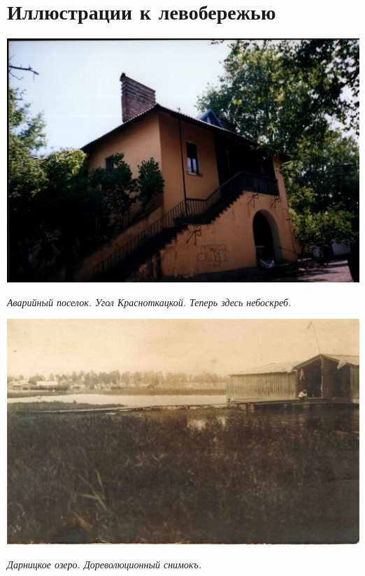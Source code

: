 \chapter*{Иллюстрации к левобережью}


\begin{center}
\includegraphics[width=\linewidth]{lpix/out0002.png}

\textit{Аварийный поселок. Угол Красноткацкой. Теперь здесь небоскреб.}
\end{center}

\newpage

\vspace*{\fill}

\begin{center}
\includegraphics[width=\linewidth]{lpix/darnickoe-ozero-dprev.jpg}

\textit{Дарницкое озеро. Дореволюционный снимокъ.}
\end{center}

